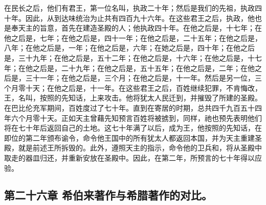 在民长之后，他们有君王，第一位名叫，执政二十年；然后是我们的先祖，执政四十年。因此，从到达味统治为止共有四百九十六年。在这些君王之后，执政，他也是奉天主的旨意，首先在建造圣殿的人；他执政四十年。在他之后是，十七年；在他之后是，七年；在他之后是，四十一年；在他之后是，二十五年；在他之后是，八年；在他之后是，一年；在他之后是，六年；在她之后是，四十年；在他之后是，三十九年；在他之后是，五十二年；在他之后是，十六年；在他之后是，十七年；在他之后是，二十九年；在他之后是，五十五年；在他之后是，二年；在他之后是，三十一年；在他之后是，三个月；在他之后是，十一年。然后是另一位，三个月零十天；在他之后是，十一年。在这些君王之后，百姓继续犯罪，不肯悔改，王，名叫，按照的先知话，上来攻击。他将犹太人民迁到，并摧毁了所建的圣殿。在巴比伦充军期间，百姓度过了七十年。直到在寄居的时期，总共四千九百五十四年六个月零十天。正如天主曾藉先知预言百姓将被掳到，同样，祂也预先表明他们将在七十年后返回自己的土地。这七十年满了以后，成为王，他按照的先知话，在即位的第二年颁布谕令，命令他王国中的所有犹太人都返回本国，并为天主重建圣殿，就是前述王所拆毁的。此外，遵照天主的指示，命令他的卫兵和，将从圣殿中取走的器皿归还，并重新安放在圣殿中。因此，在第二年，所预言的七十年得以应验。\par


\subsection{第二十六章 希伯来著作与希腊著作的对比。}

